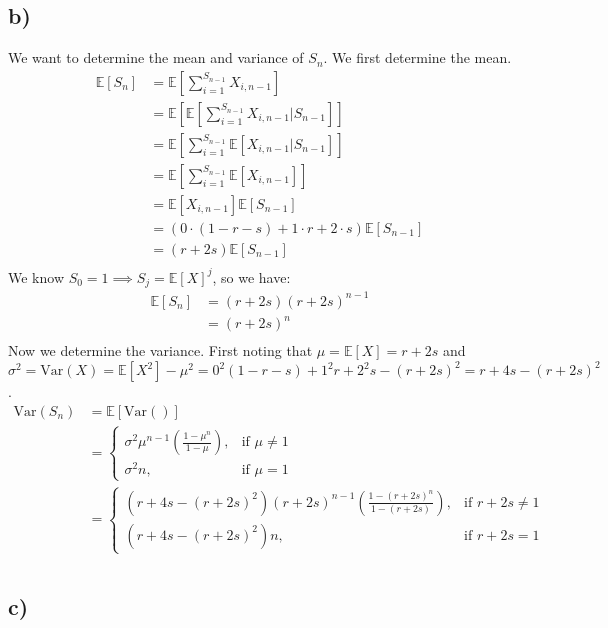 \documentclass{article}
\begin{document}
\subsection*{b)}
We want to determine the mean and variance of $S_n$. We first determine the mean.
\begin{align*}
\mathbb{E}[S_n]&=\mathbb{E}\left[\sum_{i=1}^{S_{n-1}}X_{i,n-1}\right]\\
&=\mathbb{E}\left[\mathbb{E}\left[\sum_{i=1}^{S_{n-1}}X_{i,n-1}|S_{n-1}\right]\right]\\
&=\mathbb{E}\left[\sum_{i=1}^{S_{n-1}}\mathbb{E}\left[X_{i,n-1}|S_{n-1}\right]\right]\\
&=\mathbb{E}\left[\sum_{i=1}^{S_{n-1}}\mathbb{E}\left[X_{i,n-1}\right]\right]\\
&=\mathbb{E}[X_{i,n-1}]\mathbb{E}[S_{n-1}]\\
&=(0\cdot(1-r-s)+1\cdot r+2\cdot s)\mathbb{E}[S_{n-1}]\\
&=(r+2s)\mathbb{E}[S_{n-1}]\\
\end{align*}
We know $S_0=1\implies S_j=\mathbb{E}[X]^j$, so we have:
\begin{align*}
\mathbb{E}[S_n]&=(r+2s)(r+2s)^{n-1}\\
&=(r+2s)^n\\
\end{align*}
Now we determine the variance. First noting that $\mu=\mathbb{E}[X]=r+2s$ and  $\sigma^2=\text{Var}(X)=\mathbb{E}[X^2]-\mu^2=0^2(1-r-s)+1^2r+2^2s-(r+2s)^2=r+4s-(r+2s)^2$.
\begin{align*}
\text{Var}(S_n)&=\mathbb{E}[\text{Var}()]\\
&=\begin{cases}\sigma^2\mu^{n-1}\left(\frac{1-\mu^n}{1-\mu}\right), & \text{if } \mu\neq1\\\sigma^2 n, & \text{if } \mu=1\end{cases}\\
&=\begin{cases}(r+4s-(r+2s)^2)(r+2s)^{n-1}\left(\frac{1-(r+2s)^n}{1-(r+2s)}\right), & \text{if } r+2s\neq1\\(r+4s-(r+2s)^2) n, & \text{if } r+2s=1\end{cases}\\
\end{align*}
\subsection*{c)}
\end{document}
